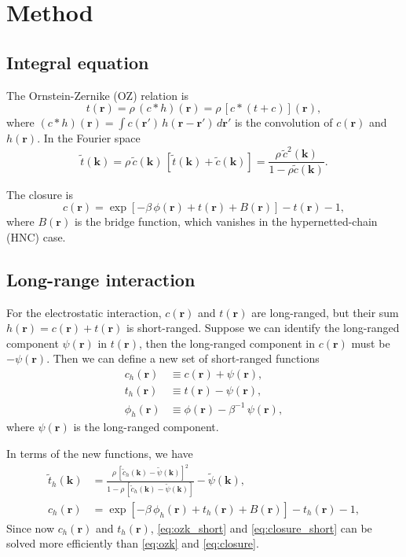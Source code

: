 \documentclass[12pt]{article}
\newcommand{\vct}[1]{\mathbf{#1}}
\providecommand{\vr}{} %
\renewcommand{\vr}{\vct{r}}
\newcommand{\vk}{\vct{k}}
\begin{document}
\section{Method}

\subsection{Integral equation}

The Ornstein-Zernike (OZ) relation is
\begin{equation}
  t(\vr) = \rho \, (c * h)(\vr)
         = \rho \, [c * (t + c)] (\vr),
  \label{eq:oz}
\end{equation}
%
where $(c * h)(\vr) = \int c(\vr') \, h(\vr - \vr') \, d\vr'$
is the convolution of $c(\vr)$ and $h(\vr)$.
%
In the Fourier space
\begin{equation}
  \tilde{t}(\vk) = \rho \, \tilde{c}(\vk) \, [\tilde{t}(\vk) + \tilde{c}(\vk)]
                 = \frac{ \rho \, \tilde{c}^2(\vk) }
                        { 1 - \rho \tilde{c}(\vk)    }.
  \label{eq:ozk}
\end{equation}

The closure is
\begin{equation}
  c(\vr) = \exp[-\beta \, \phi(\vr) + t(\vr) + B(\vr)] - t(\vr) - 1,
  \label{eq:closure}
\end{equation}
where $B(\vr)$ is the bridge function,
which vanishes in the hypernetted-chain (HNC) case.


\subsection{Long-range interaction}

For the electrostatic interaction,
$c(\vr)$ and $t(\vr)$ are long-ranged,
but their sum $h(\vr) = c(\vr) + t(\vr)$ is short-ranged.
%
Suppose we can identify the long-ranged component $\psi(\vr)$ in $t(\vr)$,
then the long-ranged component in $c(\vr)$ must be $-\psi(\vr)$.
%
Then we can define a new set of short-ranged functions
%
\begin{align}
  c_h(\vr)     &\equiv  c(\vr) + \psi(\vr), \label{eq:ch} \\
  t_h(\vr)     &\equiv  t(\vr) - \psi(\vr), \label{eq:th} \\
  \phi_h(\vr)  &\equiv  \phi(\vr) - \beta^{-1} \, \psi(\vr),
\end{align}
%
where $\psi(\vr)$ is the long-ranged component.


In terms of the new functions, we have
\begin{align}
  \tilde{t}_h(\vk) &= \frac{ \rho \, [ \tilde{c}_h(\vk) - \tilde{\psi}(\vk) ]^2 }
                           { 1 - \rho \, [\tilde{c}_h(\vk) - \tilde{\psi}(\vk) ] }
                      -\tilde{\psi}(\vk),
  \label{eq:ozk_short}
 \\
  c_h(\vr) &= \exp[-\beta \, \phi_h(\vr) + t_h(\vr) + B(\vr)] - t_h(\vr) - 1,
  \label{eq:closure_short}
\end{align}
%
Since now $c_h(\vr)$ and $t_h(\vr)$,
\eqref{eq:ozk_short} and \eqref{eq:closure_short}
can be solved more efficiently than
\eqref{eq:ozk} and \eqref{eq:closure}.
\end{document}
